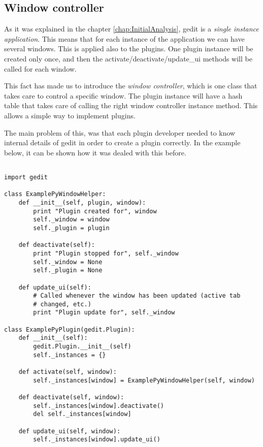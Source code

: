 \subsection{Window controller}\label{sec:WindowController}

As it was explained in the chapter \ref{chap:InitialAnalysis}, gedit is a \emph{single instance application}. This means that for each instance of the application we can have several windows. This is applied also to the plugins. One plugin instance will be created only once, and then the activate/deactivate/update\_ui methods will be called for each window.

This fact has made us to introduce the \emph{window controller}, which is one class that takes care to control a specific window. The plugin instance will have a hash table that takes care of calling the right window controller instance method. This allows a simple way to implement plugins.

The main problem of this, was that each plugin developer needed to know internal details of gedit in order to create a plugin correctly. In the example below, it can be shown how it was dealed with this before.

\begin{lstlisting}[style=python]

import gedit

class ExamplePyWindowHelper:
    def __init__(self, plugin, window):
        print "Plugin created for", window
        self._window = window
        self._plugin = plugin

    def deactivate(self):
        print "Plugin stopped for", self._window
        self._window = None
        self._plugin = None

    def update_ui(self):
        # Called whenever the window has been updated (active tab
        # changed, etc.)
        print "Plugin update for", self._window

class ExamplePyPlugin(gedit.Plugin):
    def __init__(self):
        gedit.Plugin.__init__(self)
        self._instances = {}

    def activate(self, window):
        self._instances[window] = ExamplePyWindowHelper(self, window)

    def deactivate(self, window):
        self._instances[window].deactivate()
        del self._instances[window]

    def update_ui(self, window):
        self._instances[window].update_ui()

\end{lstlisting}

